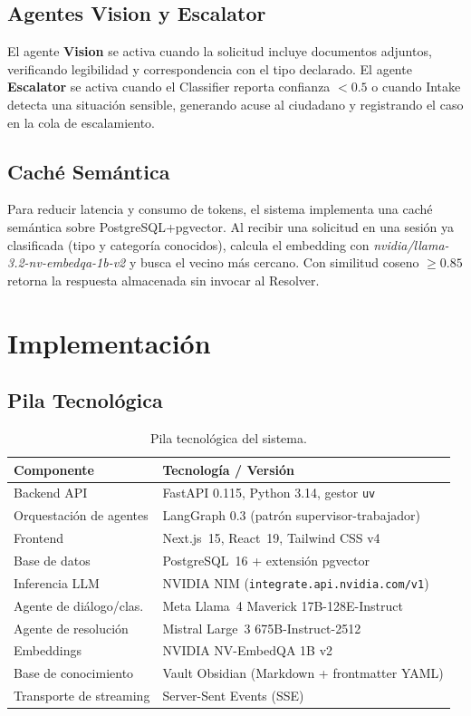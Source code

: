 \documentclass[runningheads]{llncs}
\begin{document}
\subsection{Agentes Vision y Escalator}

El agente \textbf{Vision} se activa cuando la solicitud incluye documentos adjuntos, verificando legibilidad y correspondencia con el tipo declarado. El agente \textbf{Escalator} se activa cuando el Classifier reporta confianza $< 0.5$ o cuando Intake detecta una situación sensible, generando acuse al ciudadano y registrando el caso en la cola de escalamiento.

\subsection{Caché Semántica}

Para reducir latencia y consumo de tokens, el sistema implementa una caché semántica sobre PostgreSQL+pgvector. Al recibir una solicitud en una sesión ya clasificada (tipo y categoría conocidos), calcula el embedding con \textit{nvidia/llama-3.2-nv-embedqa-1b-v2} y busca el vecino más cercano. Con similitud coseno $\geq 0.85$ retorna la respuesta almacenada sin invocar al Resolver.

\section{Implementación}
\label{sec:impl}

\subsection{Pila Tecnológica}

\begin{table}[h]
\caption{Pila tecnológica del sistema.}
\label{tab:stack}
\begin{tabular}{@{}ll@{}}
\toprule
\textbf{Componente} & \textbf{Tecnología / Versión} \\
\midrule
Backend API              & FastAPI 0.115, Python 3.14, gestor \texttt{uv} \\
Orquestación de agentes  & LangGraph 0.3 (patrón supervisor-trabajador) \\
Frontend                 & Next.js~15, React~19, Tailwind CSS v4 \\
Base de datos            & PostgreSQL~16 + extensión pgvector \\
Inferencia LLM           & NVIDIA NIM (\texttt{integrate.api.nvidia.com/v1}) \\
Agente de diálogo/clas.  & Meta Llama~4 Maverick 17B-128E-Instruct \\
Agente de resolución     & Mistral Large~3 675B-Instruct-2512 \\
Embeddings               & NVIDIA NV-EmbedQA 1B v2 \\
Base de conocimiento     & Vault Obsidian (Markdown + frontmatter YAML) \\
Transporte de streaming  & Server-Sent Events (SSE) \\
\bottomrule
\end{tabular}
\end{table}
\end{document}
